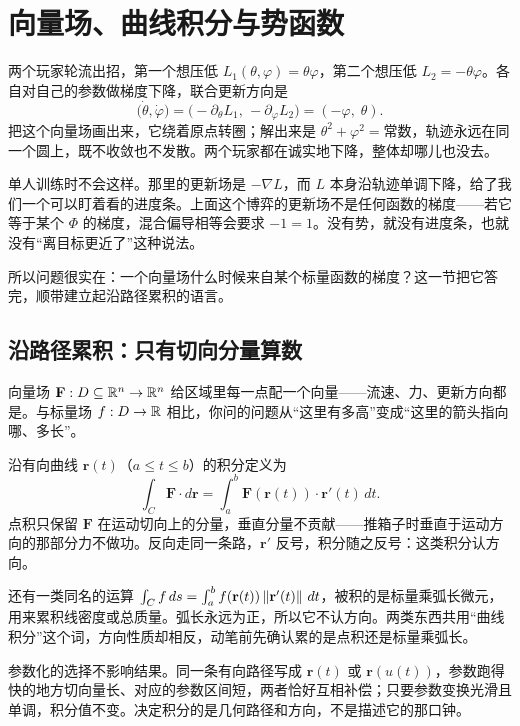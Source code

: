 \section{向量场、曲线积分与势函数}
\label{sec:02-Calculus/06-Multivariable-Calculus/08}

两个玩家轮流出招，第一个想压低 \(L_1(\theta,\varphi)=\theta\varphi\)，第二个想压低 \(L_2=-\theta\varphi\)。各自对自己的参数做梯度下降，联合更新方向是
\[
\bigl(\dot\theta,\dot\varphi\bigr)=\bigl(-\partial_\theta L_1,\,-\partial_\varphi L_2\bigr)=(-\varphi,\;\theta).
\]
把这个向量场画出来，它绕着原点转圈；解出来是 \(\theta^2+\varphi^2=\text{常数}\)，轨迹永远在同一个圆上，既不收敛也不发散。两个玩家都在诚实地下降，整体却哪儿也没去。

单人训练时不会这样。那里的更新场是 \(-\nabla L\)，而 \(L\) 本身沿轨迹单调下降，给了我们一个可以盯着看的进度条。上面这个博弈的更新场不是任何函数的梯度——若它等于某个 \(\Phi\) 的梯度，混合偏导相等会要求 \(-1=1\)。没有势，就没有进度条，也就没有``离目标更近了''这种说法。

所以问题很实在：一个向量场什么时候来自某个标量函数的梯度？这一节把它答完，顺带建立起沿路径累积的语言。

\subsection{沿路径累积：只有切向分量算数}

向量场 \(\mathbf F:D\subseteq\mathbb{R}^n\to\mathbb{R}^n\) 给区域里每一点配一个向量——流速、力、更新方向都是。与标量场 \(f:D\to\mathbb{R}\) 相比，你问的问题从``这里有多高''变成``这里的箭头指向哪、多长''。

沿有向曲线 \(\mathbf r(t)\)（\(a\le t\le b\)）的积分定义为
\[
\int_C\mathbf F\cdot d\mathbf r=\int_a^b\mathbf F(\mathbf r(t))\cdot\mathbf r'(t)\,dt .
\]
点积只保留 \(\mathbf F\) 在运动切向上的分量，垂直分量不贡献——推箱子时垂直于运动方向的那部分力不做功。反向走同一条路，\(\mathbf r'\) 反号，积分随之反号：这类积分认方向。

还有一类同名的运算 \(\int_C f\,ds=\int_a^b f(\mathbf r(t))\left\lVert\mathbf r'(t)\right\rVert\,dt\)，被积的是标量乘弧长微元，用来累积线密度或总质量。弧长永远为正，所以它不认方向。两类东西共用``曲线积分''这个词，方向性质却相反，动笔前先确认累的是点积还是标量乘弧长。

参数化的选择不影响结果。同一条有向路径写成 \(\mathbf r(t)\) 或 \(\mathbf r(u(t))\)，参数跑得快的地方切向量长、对应的参数区间短，两者恰好互相补偿；只要参数变换光滑且单调，积分值不变。决定积分的是几何路径和方向，不是描述它的那口钟。

